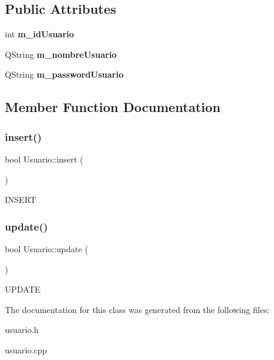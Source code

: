 \subsection*{Public Attributes}
\begin{DoxyCompactItemize}
\item 
\mbox{\label{classUsuario_adceaf46ad17f76c19ec6f2a98baba133}} 
int {\bfseries m\+\_\+id\+Usuario}
\item 
\mbox{\label{classUsuario_a69a690d2e969ab1b32ae18f94e0fb0e3}} 
Q\+String {\bfseries m\+\_\+nombre\+Usuario}
\item 
\mbox{\label{classUsuario_a6771c927d80c3c8495ed08c16dfc8488}} 
Q\+String {\bfseries m\+\_\+password\+Usuario}
\end{DoxyCompactItemize}


\subsection{Member Function Documentation}
\mbox{\label{classUsuario_a6adb77ca92414402116ed0256718b227}} 
\subsubsection{\texorpdfstring{insert()}{insert()}}
{\footnotesize\ttfamily bool Usuario\+::insert (\begin{DoxyParamCaption}{ }\end{DoxyParamCaption})}

I\+N\+S\+E\+RT \mbox{\label{classUsuario_abccc47bddb1deac69920f4dcb7a44b97}} 
\subsubsection{\texorpdfstring{update()}{update()}}
{\footnotesize\ttfamily bool Usuario\+::update (\begin{DoxyParamCaption}{ }\end{DoxyParamCaption})}

U\+P\+D\+A\+TE 

The documentation for this class was generated from the following files\+:\begin{DoxyCompactItemize}
\item 
usuario.\+h\item 
usuario.\+cpp\end{DoxyCompactItemize}
